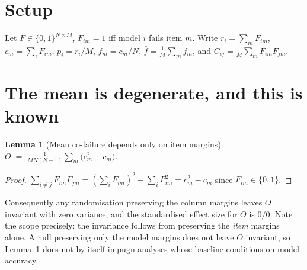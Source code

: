 \documentclass[pdflatex,sn-mathphys-ay]{sn-jnl}
\theoremstyle{thmstyleone}
\newtheorem{lemma}{Lemma}
\theoremstyle{thmstylethree}
\begin{document}
\section{Setup}

Let $F\in\{0,1\}^{N\times M}$, $F_{im}=1$ iff model $i$ fails item $m$. Write $r_i=\sum_m F_{im}$,
$c_m=\sum_i F_{im}$, $p_i=r_i/M$, $f_m=c_m/N$, $\bar f=\frac1M\sum_m f_m$, and
$C_{ij}=\frac1M\sum_m F_{im}F_{jm}$.

\section{The mean is degenerate, and this is known}
\label{sec:degeneracy}

\begin{lemma}[Mean co-failure depends only on item margins]
\label{lem:mean}
$\displaystyle O \;=\; \frac{1}{M N(N-1)}\sum_{m}\bigl(c_m^{2}-c_m\bigr).$
\end{lemma}

\begin{proof}
$\sum_{i\neq j}F_{im}F_{jm}=(\sum_i F_{im})^2-\sum_i F_{im}^2=c_m^2-c_m$ since $F_{im}\in\{0,1\}$.
\end{proof}

Consequently any randomisation preserving the column margins leaves $O$ invariant with zero
variance, and the standardised effect size for $O$ is $0/0$. Note the scope precisely: the
invariance follows from preserving the \emph{item} margins alone. A null preserving only the model
margins does not leave $O$ invariant, so Lemma~\ref{lem:mean} does not by itself impugn analyses
whose baseline conditions on model accuracy.
\end{document}
